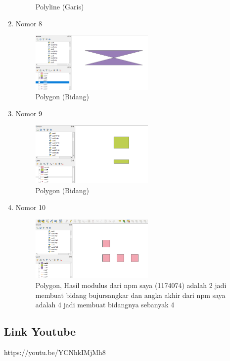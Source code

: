 \begin{enumerate}
\begin{figure}[H]
		\centering
		\caption{Polyline (Garis)}
	\end{figure}
	\item Nomor 8
	
	\begin{figure}[H]
		\includegraphics[width=6cm]{figures/Tugas2/1174074/soal8.png}
		\centering
		\caption{Polygon (Bidang)}
	\end{figure}
	\item Nomor 9
	
	\begin{figure}[H]
		\includegraphics[width=6cm]{figures/Tugas2/1174074/soal9.png}
		\centering
		\caption{Polygon (Bidang)}
	\end{figure}
	\item Nomor 10
	
	\begin{figure}[H]
		\includegraphics[width=6cm]{figures/Tugas2/1174074/soal10.png}
		\centering
		\caption{Polygon, Hasil modulus dari npm saya (1174074) adalah 2 jadi membuat bidang bujursangkar dan angka akhir dari npm saya adalah 4 jadi membuat bidangnya sebanyak 4}
	\end{figure}
\end{enumerate}
\subsection{Link Youtube}
https://youtu.be/YCNhkIMjMh8
